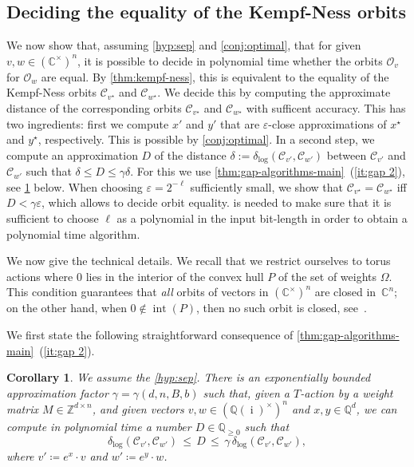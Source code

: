 \documentclass[10pt,a4paper]{article}
\newtheorem{corollary}[theorem]{Corollary}
\theoremstyle{definition}
\DeclareMathOperator{\ii}{i}
\newcommand{\distLD}{\delta_{\log}}
\DeclareMathOperator{\inter}{int}
\newcommand{\QQ}{\mathbb{Q}}
\newcommand{\CC}{\mathbb{C}}
\newcommand{\ZZ}{\mathbb{Z}}
\newcommand{\OO}{\ensuremath{\mathcal{O}}}
\newcommand{\KK}{\ensuremath{\mathcal{C}}}
\numberwithin{equation}{section}
\begin{document}
\subsection{Deciding the equality of the Kempf-Ness orbits}\label{sec:kn-approach-in-poly-time}
We now show that, assuming \cref{hyp:sep} and \cref{conj:optimal}, that for given $v,w\in (\CC^\times)^n$,
it is possible to decide in polynomial time whether the orbits $\OO_v$ for $\OO_w$ are equal.
By \cref{thm:kempf-ness}, this is equivalent to the equality of the Kempf-Ness orbits
$\KK_{v^\star}$ and $\KK_{w^\star}$. We decide this
by computing the approximate distance of the corresponding orbits
$\KK_{v^\star}$ and $\KK_{w^\star}$
with sufficent accuracy.
This has two ingredients: first we compute $x'$ and $y'$ that are $\varepsilon$-close approximations of $x^\star$ and $y^\star$, respectively.
This is possible by  \cref{conj:optimal}.
In a second step, we compute an approximation $D$ of the distance
$\delta:=\distLD (\KK_{v'} , \KK_{w'})$ between $\KK_{v'}$ and $\KK_{w'}$
such that $\delta \leq D \leq \gamma \delta$.
For this we use \cref{thm:gap-algorithms-main}~(\ref{it:gap 2}),
see \cref{prop:delta-prime-approx} below.
When choosing $\varepsilon=2^{-\ell}$ sufficiently small, we show that
$\KK_{v^\star} = \KK_{w^\star}$ iff $D < \gamma\varepsilon$,
which allows to decide orbit equality.
 is needed to make sure that it is sufficient to
choose $\ell$ as a polynomial in the input bit-length
in order to obtain a polynomial time algorithm.

We now give the technical details.
We recall that we restrict ourselves to torus actions where $0$ lies in the interior of the convex hull $P$ of the set of weights $\Omega$.
This condition guarantees that {\em all} orbits of vectors in $(\CC^\times)^n$ are closed in~$\CC^n$;
on the other hand, when $0\not\in\inter(P)$, then no such orbit is closed, see~\cite{torus}.


We first state the following straightforward consequence of \cref{thm:gap-algorithms-main}~(\ref{it:gap 2}).

\begin{corollary}\label{prop:delta-prime-approx}
We assume the \cref{hyp:sep}. %
There is an exponentially bounded approximation factor $\gamma=\gamma(d,n,B,b)$
such that,
given a $T$-action by a weight matrix $M\in\ZZ^{d\times n}$, and
given vectors  $v,w\in(\QQ(\ii)^\times)^n$ and $x,y\in\QQ^d$,
we can compute in polynomial time a number $D\in\QQ_{\geq 0}$ such that
\[
    \distLD ( \KK_{v'}, \KK_{w'} )\, \leq\, D \,\leq\, \gamma\, \distLD (\KK_{v'} , \KK_{w'}) ,
\]
where $v'\coloneqq e^x\cdot v$ and $w'\coloneqq e^y\cdot w$.
\end{corollary}
\end{document}
